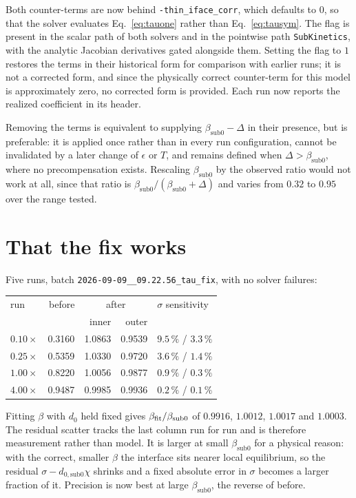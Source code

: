 \documentclass[11pt,a4paper]{article}
\newcommand{\code}[1]{\texttt{\small #1}}
\newcommand{\bsub}{\beta_{\mathrm{sub0}}}
\newcommand{\dsub}{d_{0,\mathrm{sub0}}}
\begin{document}
Both counter-terms are now behind \code{-thin\_iface\_corr}, which defaults to $0$, so
that the solver evaluates Eq.~\eqref{eq:tauone} rather than Eq.~\eqref{eq:tausym}. The
flag is present in the scalar path of both solvers and in the pointwise path \code{SubKinetics}, with the
analytic Jacobian derivatives gated alongside them. Setting the flag to $1$ restores the
terms in their historical form for comparison with earlier runs; it is not a corrected
form, and since the physically correct counter-term for this model is approximately zero,
no corrected form is provided. Each run now reports the realized coefficient in its
header.

Removing the terms is equivalent to supplying $\bsub-\Delta$ in their presence, but is
preferable: it is applied once rather than in every run configuration, cannot be
invalidated by a later change of $\epsilon$ or $T$, and remains defined when
$\Delta>\bsub$, where no precompensation exists. Rescaling $\bsub$ by the observed ratio
would not work at all, since that ratio is $\bsub/(\bsub+\Delta)$ and varies from $0.32$
to $0.95$ over the range tested.

\section{That the fix works}

Five runs, batch \code{2026-09-09\_\_09.22.56\_tau\_fix}, with no solver failures:
\begin{center}\small\begin{tabular}{lrrrl}\toprule
run & before & \multicolumn{2}{c}{after} & $\sigma$ sensitivity\\
 & & inner & outer & \\ \midrule
$0.10\times$ & 0.3160 & 1.0863 & 0.9539 & $9.5\,\%$ / $3.3\,\%$\\
$0.25\times$ & 0.5359 & 1.0330 & 0.9720 & $3.6\,\%$ / $1.4\,\%$\\
$1.00\times$ & 0.8220 & 1.0056 & 0.9877 & $0.9\,\%$ / $0.3\,\%$\\
$4.00\times$ & 0.9487 & 0.9985 & 0.9936 & $0.2\,\%$ / $0.1\,\%$\\ \bottomrule
\end{tabular}\end{center}
Fitting $\beta$ with $d_0$ held fixed gives $\beta_{\rm fit}/\bsub$ of $0.9916$, $1.0012$,
$1.0017$ and $1.0003$. The residual scatter tracks the last column run for run and is
therefore measurement rather than model. It is larger at small $\bsub$ for a physical
reason: with the correct, smaller $\beta$ the interface sits nearer local equilibrium, so
the residual $\sigma-\dsub\chi$ shrinks and a fixed absolute error in $\sigma$ becomes a
larger fraction of it. Precision is now best at large $\bsub$, the reverse of before.
\end{document}
